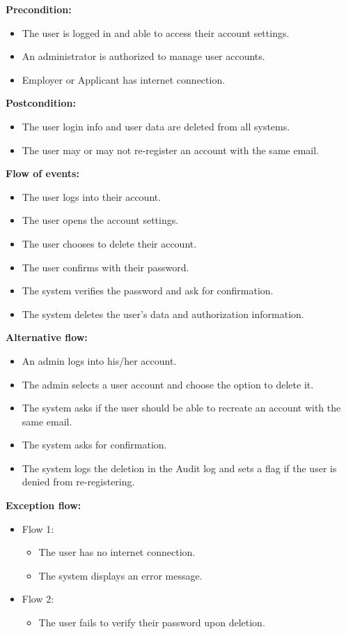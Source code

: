 \documentclass[a4paper]{article}
\begin{document}
\textbf{Precondition:}
\begin{itemize}
  \item The user is logged in and able to access their account settings.
  \item An administrator is authorized to manage user accounts.
  \item Employer or Applicant has internet connection.
\end{itemize}

\textbf{Postcondition:}
\begin{itemize}
  \item The user login info and user data are deleted from all systems.
  \item The user may or may not re-register an account with the same email.
\end{itemize}

\textbf{Flow of events:}
\begin{itemize}
  \item The user logs into their account.
  \item The user opens the account settings.
  \item The user chooses to delete their account.
  \item The user confirms with their password.
  \item The system verifies the password and ask for confirmation.
  \item The system deletes the user's data and authorization information.
\end{itemize}

\textbf{Alternative flow:}
\begin{itemize}
  \item An admin logs into his/her account.
  \item The admin selects a user account and choose the option to delete it.
  \item The system asks if the user should be able to recreate an account with the same email.
  \item The system asks for confirmation.
  \item The system logs the deletion in the Audit log and sets a flag if the user is denied from re-registering.
\end{itemize}

\textbf{Exception flow:}
\begin{itemize}
  \item Flow 1:
    \begin{itemize}
      \item The user has no internet connection.
      \item The system displays an error message.
    \end{itemize}
  \item Flow 2:
    \begin{itemize}
      \item The user fails to verify their password upon deletion.
    \end{itemize}
\end{itemize}
\end{document}
